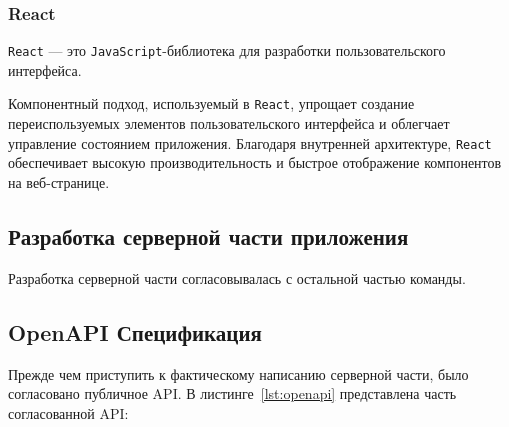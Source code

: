 \subsubsection{React}

\texttt{React} --- это \texttt{JavaScript}-библиотека для разработки пользовательского интерфейса.

Компонентный подход, используемый в \texttt{React}, упрощает создание переиспользуемых элементов пользовательского интерфейса и облегчает управление состоянием приложения. 
Благодаря внутренней архитектуре, \texttt{React} обеспечивает высокую производительность и быстрое отображение компонентов на веб-странице.

\subsection{Разработка серверной части приложения}
Разработка серверной части согласовывалась с остальной частью команды.

\subsection{OpenAPI Спецификация}

Прежде чем приступить к фактическому написанию серверной части, было согласовано публичное API. В листинге~\ref{lst:openapi} представлена часть согласованной API:

